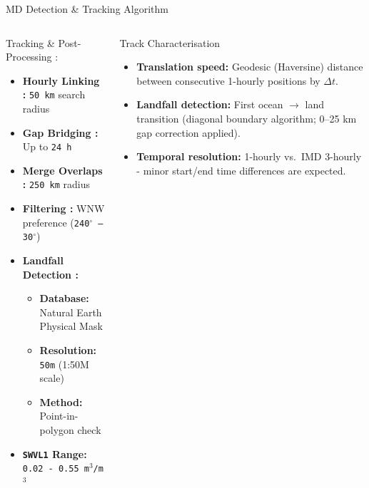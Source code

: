 \documentclass[10pt, aspectratio=169,t,xcolor=table]{beamer}
\begin{document}
\begin{frame}{MD Detection \& Tracking Algorithm}
\begin{columns}[t]
		\begin{block}{\small Tracking \& Post-Processing :}
			\footnotesize
			\begin{itemize}
				\item \textbf{Hourly Linking :} \texttt{50 km} search radius
				\item \textbf{Gap Bridging :} Up to \texttt{24 h}
				\item \textbf{Merge Overlaps :} \texttt{250 km} radius
				\item \textbf{Filtering :} WNW preference (\texttt{240$^{\circ}$ – 30$^{\circ}$})
			\end{itemize}
			\begin{itemize}
				\item \textbf{Landfall Detection :}
				      \begin{itemize}
					      \item \textbf{Database:} Natural Earth Physical Mask
					      \item \textbf{Resolution:} \texttt{50m} (1:50M scale)
					      \item \textbf{Method:} Point-in-polygon check
				      \end{itemize}
				\item \textbf{\texttt{SWVL1} Range\footnotemark[2] :} \texttt{0.02 - 0.55 m$^3$/m$^3$}
			\end{itemize}
		\end{block}

		\vspace{0.2cm}
		\begin{block}{\small Track Characterisation}
			\begin{itemize}\footnotesize
				\item \textbf{Translation speed:} Geodesic (Haversine) distance between
				      consecutive 1-hourly positions by $\Delta t$.
				\item \textbf{Landfall detection:} First ocean $\to$ land transition (diagonal
				      boundary algorithm; 0–25 km gap correction applied).
				\item \textbf{Temporal resolution:} 1-hourly vs.\ IMD 3-hourly - minor
				      start/end time differences are expected.
			\end{itemize}
		\end{block}



\end{columns}
\end{frame}
\end{document}
